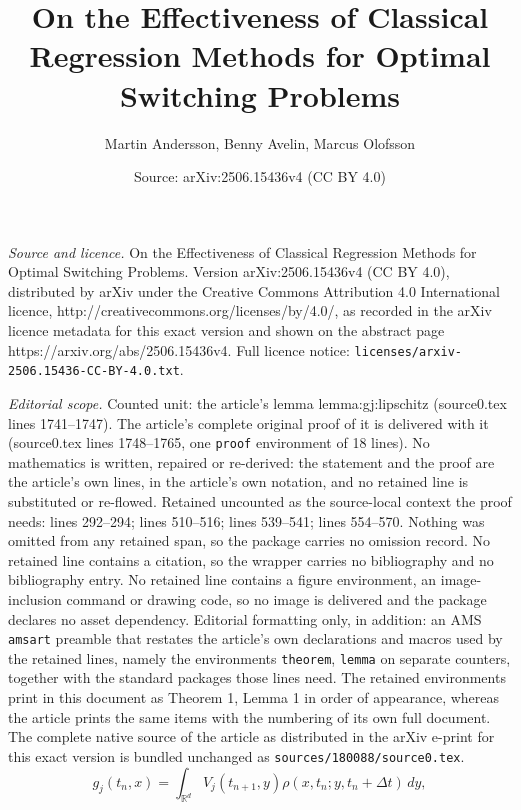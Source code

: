 \documentclass[10pt,a4paper]{amsart}
\title{On the Effectiveness of Classical Regression Methods for Optimal Switching Problems}
\author{Martin Andersson, Benny Avelin, Marcus Olofsson}
\date{Source: arXiv:2506.15436v4 (CC BY 4.0)}
\DeclareMathOperator{\R}{\mathbb{R}}
\begin{document}
\maketitle

\noindent\emph{Source and licence.} On the Effectiveness of Classical Regression Methods for Optimal Switching Problems. Version arXiv:2506.15436v4 (CC BY 4.0), distributed by arXiv under the Creative Commons Attribution 4.0 International licence, http://creativecommons.org/licenses/by/4.0/, as recorded in the arXiv licence metadata for this exact version and shown on the abstract page https://arxiv.org/abs/2506.15436v4. Full licence notice: \texttt{licenses/arxiv-2506.15436-CC-BY-4.0.txt}.\par\smallskip

\noindent\textit{Editorial scope.} Counted unit: the article's lemma lemma:gj:lipschitz (source0.tex lines 1741--1747). The article's complete original proof of it is delivered with it (source0.tex lines 1748--1765, one \texttt{proof} environment of 18 lines). No mathematics is written, repaired or re-derived: the statement and the proof are the article's own lines, in the article's own notation, and no retained line is substituted or re-flowed.  Retained uncounted as the source-local context the proof needs: lines 292--294; lines 510--516; lines 539--541; lines 554--570.  Nothing was omitted from any retained span, so the package carries no omission record.  No retained line contains a citation, so the wrapper carries no bibliography and no bibliography entry.  No retained line contains a figure environment, an image-inclusion command or drawing code, so no image is delivered and the package declares no asset dependency.  Editorial formatting only, in addition: an AMS \texttt{amsart} preamble that restates the article's own declarations and macros used by the retained lines, namely the environments \texttt{theorem}, \texttt{lemma} on separate counters, together with the standard packages those lines need.  The retained environments print in this document as Theorem 1, Lemma 1 in order of appearance, whereas the article prints the same items with the numbering of its own full document.  The complete native source of the article as distributed in the arXiv e-print for this exact version is bundled unchanged as \texttt{sources/180088/source0.tex}.
\begin{equation} \label{eq:gj}
  g_j(t_n,x) = \int_{\R^d}{\widehat V}_j(t_{n+1},y)\rho(x,t_n;y,t_n+\Delta t)\,dy,
\end{equation}
\end{document}

